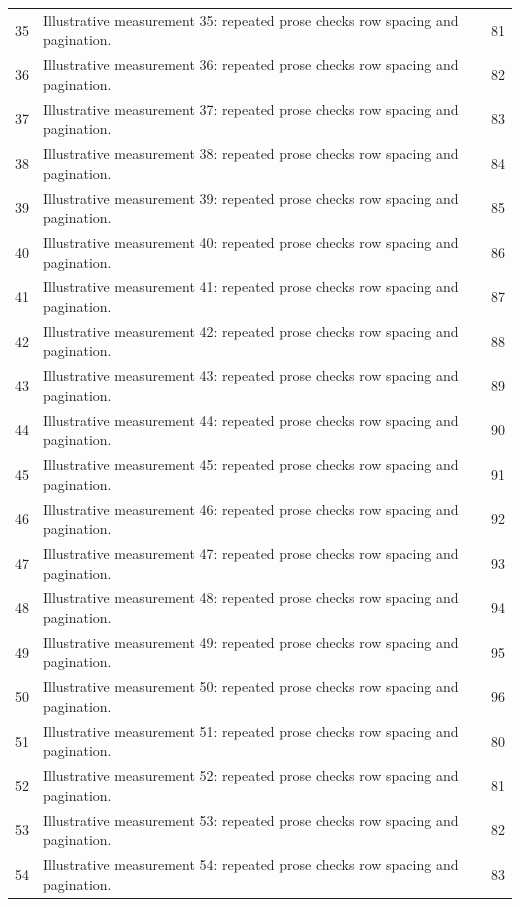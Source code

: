 \documentclass[algorithms,listings]{tempusreport}
\begin{document}
\begin{longtable}{@{}r >{\raggedright\arraybackslash}p{.62\linewidth} r@{}}
35 & Illustrative measurement 35: repeated prose checks row spacing and pagination. & 81 \\
36 & Illustrative measurement 36: repeated prose checks row spacing and pagination. & 82 \\
37 & Illustrative measurement 37: repeated prose checks row spacing and pagination. & 83 \\
38 & Illustrative measurement 38: repeated prose checks row spacing and pagination. & 84 \\
39 & Illustrative measurement 39: repeated prose checks row spacing and pagination. & 85 \\
40 & Illustrative measurement 40: repeated prose checks row spacing and pagination. & 86 \\
41 & Illustrative measurement 41: repeated prose checks row spacing and pagination. & 87 \\
42 & Illustrative measurement 42: repeated prose checks row spacing and pagination. & 88 \\
43 & Illustrative measurement 43: repeated prose checks row spacing and pagination. & 89 \\
44 & Illustrative measurement 44: repeated prose checks row spacing and pagination. & 90 \\
45 & Illustrative measurement 45: repeated prose checks row spacing and pagination. & 91 \\
46 & Illustrative measurement 46: repeated prose checks row spacing and pagination. & 92 \\
47 & Illustrative measurement 47: repeated prose checks row spacing and pagination. & 93 \\
48 & Illustrative measurement 48: repeated prose checks row spacing and pagination. & 94 \\
49 & Illustrative measurement 49: repeated prose checks row spacing and pagination. & 95 \\
50 & Illustrative measurement 50: repeated prose checks row spacing and pagination. & 96 \\
51 & Illustrative measurement 51: repeated prose checks row spacing and pagination. & 80 \\
52 & Illustrative measurement 52: repeated prose checks row spacing and pagination. & 81 \\
53 & Illustrative measurement 53: repeated prose checks row spacing and pagination. & 82 \\
54 & Illustrative measurement 54: repeated prose checks row spacing and pagination. & 83 \\

\end{longtable}
\end{document}

